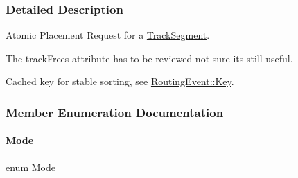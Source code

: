 \subsubsection{Detailed Description}
Atomic Placement Request for a \mbox{\hyperlink{classKite_1_1TrackSegment}{Track\+Segment}}. 

The track\+Frees attribute has to be reviewed not sure it\textquotesingle{}s still useful.

Cached key for stable sorting, see \mbox{\hyperlink{classKite_1_1RoutingEvent_1_1Key}{Routing\+Event\+::\+Key}}. 

\subsubsection{Member Enumeration Documentation}
\mbox{\label{classKite_1_1RoutingEvent_a46c8a310cf4c094f8c80e1cb8dc1f911}} 
\paragraph{\texorpdfstring{Mode}{Mode}}
{\footnotesize\ttfamily enum \mbox{\hyperlink{classKite_1_1RoutingEvent_a46c8a310cf4c094f8c80e1cb8dc1f911}{Mode}}}

